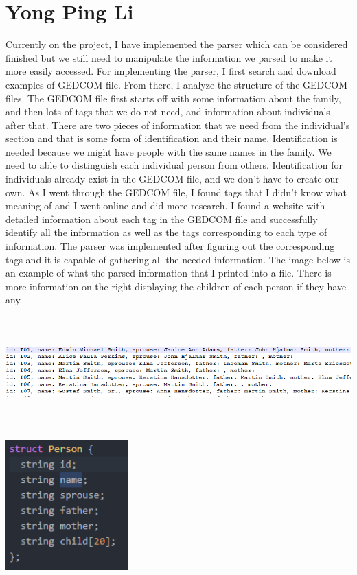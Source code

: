 \documentclass[onecolumn, draftclsnofoot, 10pt, compsoc]{IEEEtran}
\begin{document}
\section{Yong Ping Li}
\begin{singlespace}
Currently on the project, I have implemented the parser which can be considered finished but we still need to manipulate the information we parsed to make it more easily accessed. For implementing the parser, I first search and download examples of GEDCOM file. From there, I analyze the structure of the GEDCOM files. The GEDCOM file first starts off with some information about the family, and then lots of tags that we do not need, and information about individuals after that. There are two pieces of information that we need from the individual's section and that is some form of identification and their name. Identification is needed because we might have people with the same names in the family. We need to able to distinguish each individual person from others. Identification for individuals already exist in the GEDCOM file, and we don't have to create our own. As I went through the GEDCOM file, I found tags that I didn't know what meaning of and I went online and did more research. I found a website with detailed information about each tag in the GEDCOM file and successfully identify all the information as well as the tags corresponding to each type of information. The parser was implemented after figuring out the corresponding tags and it is capable of gathering all the needed information. The image below is an example of what the parsed information that I printed into a file. There is more information on the right displaying the children of each person if they have any.
\newline
\newline
\includegraphics[height=5cm,width=18cm]{data}\\
\includegraphics[height=5cm]{struct}

\end{singlespace}
\end{document}
